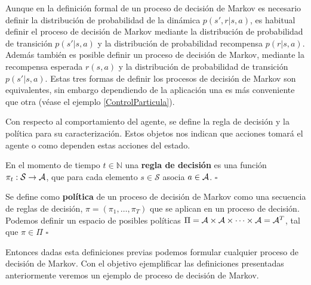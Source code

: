 Aunque en la definición formal de un proceso de decisión de Markov es necesario definir la distribución de probabilidad de la dinámica $p(s',r|s,a)$, es habitual definir el proceso de decisión de Markov mediante la distribución de probabilidad de transición $p(s'|s,a)$ y la distribución de probabilidad recompensa $p(r|s,a)$. 
%
Además también es posible definir un proceso de decisión de Markov, mediante la recompensa esperada $r(s,a)$ y la distribución de probabilidad de transición $p(s'|s,a)$. 
%
Estas tres formas de definir los procesos de decisión de Markov son equivalentes, sin embargo dependiendo de la aplicación una es más conveniente que otra (véase el ejemplo \ref{ControlParticula}). 



Con respecto al comportamiento del agente, se define la regla de decisión y la política para su caracterización. Estos objetos nos indican que acciones tomará el agente o como dependen estas acciones del estado.


\begin{defi}
    En el momento de tiempo $t\in \mathbb{N}$ una \textbf{regla de decisión} es una función $\pi_t:\mathcal{S} \rightarrow \mathcal{A}$, que para cada elemento $s \in \mathcal{S}$ asocia $a \in \mathcal{A}$. 
    \hfill\ensuremath{\square}
\end{defi}

\begin{defi}[Política]
Se define como \textbf{política} de un proceso de decisión de Markov como una secuencia de reglas de decisión, $\pi = (\pi_1,\dots,\pi_T)$ que se aplican en un proceso de decisión. Podemos definir un espacio de posibles políticas $\Pi = \mathcal{A}\times \mathcal{A} \times \dots \times \mathcal{A} =\mathcal{A}^T$, tal que $\pi \in \Pi$
\hfill\ensuremath{\square}
\end{defi}

Entonces dadas esta definiciones previas podemos formular cualquier proceso de decisión de Markov. Con el objetivo ejemplificar las definiciones presentadas anteriormente veremos  un ejemplo de proceso de decisión de Markov.
 
